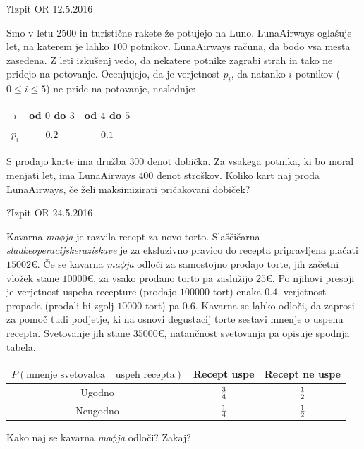 \begin{naloga}{?}{Izpit OR 12.5.2016}
\begin{vprasanje}
Smo v letu 2500 in turistične rakete že potujejo na Luno.
LunaAirways oglašuje let, na katerem je lahko $100$ potnikov.
LunaAirways računa, da bodo vsa mesta zasedena.
Z leti izkušenj vedo,
da nekatere potnike zagrabi strah in tako ne pridejo na potovanje.
Ocenjujejo, da je verjetnost $p_i$,
da natanko $i$ potnikov ($0 \le i \le 5$) ne pride na potovanje,
naslednje:
\begin{center}
\begin{tabular}{c|cc}
$i$ & od $0$ do $3$ & od $4$ do $5$ \\ \hline
$p_i$ & $0.2$ & $0.1$
\end{tabular}
\end{center}

S prodajo karte ima družba $300$ denot dobička.
Za vsakega potnika, ki bo moral menjati let,
ima LunaAirways $400$ denot stroškov.
Koliko kart naj proda LunaAirways, če želi maksimizirati pričakovani dobiček?
\end{vprasanje}
\begin{odgovor}
\end{odgovor}
\end{naloga}


\begin{naloga}{?}{Izpit OR 24.5.2016}
\begin{vprasanje}
Kavarna {\em ma$\phi$ja} je razvila recept za novo torto.
Slaščičarna {\em sladkeoperacijskeraziskave}
je za eksluzivno pravico do recepta pripravljena plačati $15002 €$.
Če se kavarna {\em ma$\phi$ja} odloči za samostojno prodajo torte,
jih začetni vložek stane $10000 €$,
za vsako prodano torto pa zaslužijo $25 €$.
Po njihovi presoji
je verjetnost uspeha recepture (prodajo $100000$ tort) enaka $0.4$,
verjetnost propada (prodali bi zgolj $10000$ tort) pa $0.6$.
Kavarna se lahko odloči, da zaprosi za pomoč tudi pod\-jet\-je,
ki na osnovi degustacij torte sestavi mnenje o uspehu recepta.
Svetovanje jih stane $35000 €$,
natančnost svetovanja pa opisuje spodnja tabela.
\begin{center}
\begin{tabular}{c|cc}
$P(\text{mnenje svetovalca} \;|\;\ \text{uspeh recepta})$
& Recept uspe & Recept ne uspe \\ \hline
Ugodno   & ${3 \over 4}$ & ${1 \over 2}$ \\
Neugodno & ${1 \over 4}$ & ${1 \over 2}$
\end{tabular}
\end{center}
Kako naj se kavarna {\em ma$\phi$ja} odloči?
Zakaj?
\end{vprasanje}
\begin{odgovor}
\end{odgovor}
\end{naloga}


